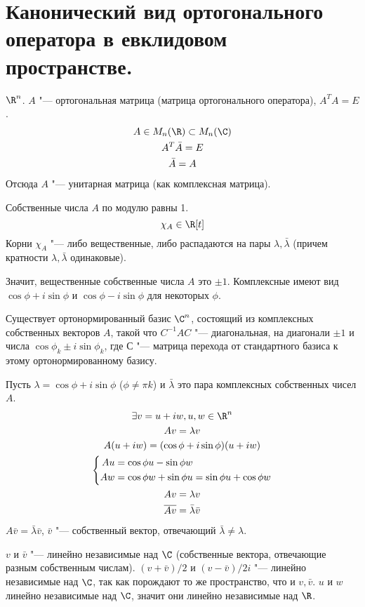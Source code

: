 ﻿\section{Канонический вид ортогонального оператора в евклидовом пространстве.}

$\R^n$.
$A$ "--- ортогональная матрица (матрица ортогонального оператора), $A^TA = E$.
\begin{gather*}
	A \in M_n(\R) \subset M_n(\C) \\
	A^{T}\bar A = E \\
	\bar A = A
\end{gather*}
Отсюда $A$ "--- унитарная матрица (как комплексная матрица).

Собственные числа $A$ по модулю равны 1.
\[ \chi_A \in \R[t] \]
Корни $\chi_A$ "--- либо вещественные, либо
распадаются на пары $\lambda, \bar \lambda$ (причем кратности $\lambda, \bar \lambda$ одинаковые).

Значит, вещественные собственные числа $A$ это $\pm 1$.
Комплексные имеют вид $\cos \phi + i \sin \phi$ и $\cos \phi - i \sin \phi$ для некоторых $\phi$.

Существует ортонормированный базис $\C^n$, состоящий из комплексных собственных векторов $A$,
такой что $C^{-1}AC$ "--- диагональная, на диагонали $\pm 1$ и числа $\cos \phi_k \pm i \sin \phi_k$,
где $С$ "--- матрица перехода от стандартного базиса к этому ортонормированному базису.

Пусть $\lambda = \cos \phi + i \sin \phi$ ($\phi \ne \pi k$) и $\bar \lambda$ это пара комплексных собственных чисел $A$.
\begin{gather*}
	\exists v = u + iw, u, w\in \R^n \\
	Av = \lambda v \\
	A(u + iw) = (\cos \phi + i \sin \phi)(u + iw) \\
	\left\{\begin{aligned}
		Au &= \cos \phi u - \sin \phi w \\
		Aw &= \cos \phi w + \sin \phi u = \sin \phi u + \cos \phi w
	\end{aligned}\right.\\
	Av = \lambda v \\
	\overline{Av} = \bar\lambda \bar v
\end{gather*}
$A \bar v = \bar\lambda \bar v$, $\bar v$ "--- собственный вектор, отвечающий $\bar \lambda \ne \lambda$.

$v$ и $\bar v$ "--- линейно независимые над $\C$ (собственные вектора, отвечающие разным собственным числам).
$(v + \bar v)/2$ и $(v - \bar v)/2i$ "--- линейно независимые над $\C$, так как порождают то же пространство, что и $v, \bar v$.
$u$ и $w$ линейно независимые над $\C$, значит они линейно независимые над $\R$.

